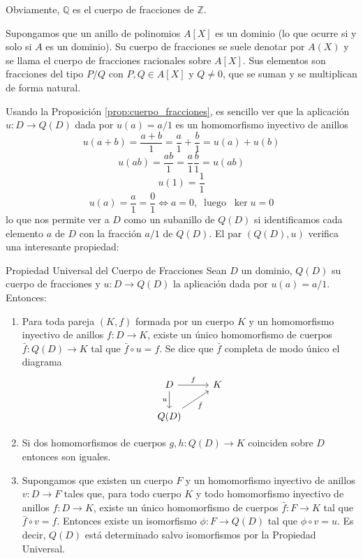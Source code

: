 \begin{example}{}{}
Obviamente, \(\mathbb{Q}\) es el cuerpo de fracciones de \(\mathbb{Z}\).
\end{example}

\begin{example}{}{}
Supongamos que un anillo de polinomios \(A[X]\) es un dominio (lo que ocurre si y solo si \(A\) es un dominio). Su cuerpo de fracciones se suele denotar por \(A(X)\) y se llama el cuerpo de fracciones racionales sobre \(A[X]\). Sus elementos son fracciones del tipo \(P/Q\) con \(P, Q \in A[X]\) y \(Q \neq 0\), que se suman y se multiplican de forma natural.
\end{example}

Usando la Proposición \ref{prop:cuerpo_fracciones}, es sencillo ver que la aplicación \(u: D \to Q(D)\) dada por \(u(a) = a/1\) es un homomorfismo inyectivo de anillos
\[
u(a + b) = \frac{a + b}{1} = \frac{a}{1} + \frac{b}{1} = u(a) + u(b)
\]
\[
u(ab) = \frac{ab}{1} = \frac{a}{1} \frac{b}{1} = u(ab)
\]
\[
u(1) = \frac{1}{1}
\]
\[
u(a) = \frac{a}{1} = \frac{0}{1} \iff a = 0,~\text{ luego }~ \ker u = 0
\]
lo que nos permite ver a \(D\) como un subanillo de \(Q(D)\) si identificamos cada elemento \(a\) de \(D\) con la fracción \(a/1\) de \(Q(D)\). El par \((Q(D), u)\) verifica una interesante propiedad:

\begin{proposition}{Propiedad Universal del Cuerpo de Fracciones}{}
Sean \(D\) un dominio, \(Q(D)\) su cuerpo de fracciones y \(u: D \to Q(D)\) la aplicación dada por \(u(a) = a/1\). Entonces:

\begin{enumerate}
\item Para toda pareja \((K, f)\) formada por un cuerpo \(K\) y un homomorfismo inyectivo de anillos \(f: D \to K\), existe un único homomorfismo de cuerpos \(\bar{f}: Q(D) \to K\) tal que \(\bar{f} \circ u = f\). Se dice que \(\bar{f}\) completa de modo único el diagrama
\[
\begin{tikzcd}
D \arrow[r, "f"] \arrow[d, "u"'] & K \\
Q(D) \arrow[ru, "\bar{f}"'] &
\end{tikzcd}
\]

\item Si dos homomorfismos de cuerpos \(g, h: Q(D) \to K\) coinciden sobre \(D\) entonces son iguales.

\item Supongamos que existen un cuerpo $F$ y un homomorfismo inyectivo de anillos $v : D \to F$ tales que, para todo cuerpo $K$ y todo homomorfismo inyectivo de anillos $f : D \to K$, existe un único homomorfismo de cuerpos $\bar{f} : F \to K$ tal que $\bar{f} \circ v = f$. Entonces existe un isomorfismo $\phi : F \to Q(D)$ tal que $\phi \circ v = u$. Es decir, \(Q(D)\) está determinado salvo isomorfismos por la Propiedad Universal.
\end{enumerate}

\end{proposition}

